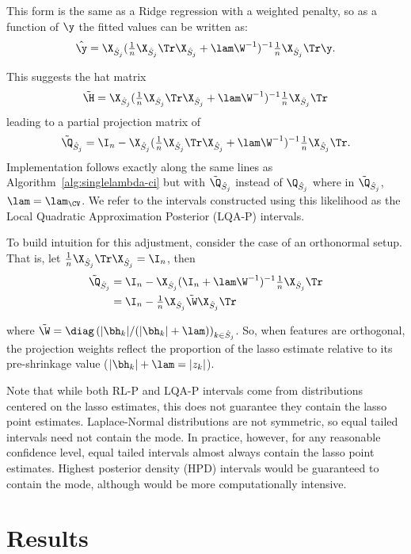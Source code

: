 \noindent This form is the same as a Ridge regression with a weighted penalty, so as a function of $\y$ the fitted values can be written as:
$$
\hat{\y} = \X_{\hat{S}_j}(\tfrac{1}{n}\X_{\hat{S}_j} \Tr\X_{\hat{S}_j} + \lam\W^{-1})^{-1}\tfrac{1}{n}\X_{\hat{S}_j} \Tr \y.
$$

\noindent This suggests the hat matrix 
$$\tilde{\H} = \X_{\hat{S}_j}(\tfrac{1}{n}\X_{\hat{S}_j} \Tr\X_{\hat{S}_j} + \lam\W^{-1})^{-1}\tfrac{1}{n}\X_{\hat{S}_j} \Tr$$
leading to a partial projection matrix of 
$$\tilde{\Q}_{\hat{S}_j} = \I_n - \X_{\hat{S}_j}(\tfrac{1}{n}\X_{\hat{S}_j} \Tr\X_{\hat{S}_j} + \lam\W^{-1})^{-1}\tfrac{1}{n}\X_{\hat{S}_j} \Tr.$$ 
Implementation follows exactly along the same lines as Algorithm~\ref{alg:singlelambda-ci} but with $\tilde{\Q}_{\hat{S}_j}$ instead of $\Q_{\hat{S}_j}$ where in $\tilde{\Q}_{\hat{S}_j}$, $\lam = \lam_{\CV}$. We refer to the intervals constructed using this likelihood as the Local Quadratic Approximation Posterior (LQA-P) intervals.

To build intuition for this adjustment, consider the case of an orthonormal setup. That is, let $\frac{1}{n}\X_{\hat{S}_j} \Tr\X_{\hat{S}_j} = \I_n$, then
$$
\begin{aligned}
\tilde{\Q}_{\hat{S}_j} &= \I_n - \X_{\hat{S}_j}(\I_n + \lam\W^{-1})^{-1}\tfrac{1}{n}\X_{\hat{S}_j} \Tr\\
&= \I_n - \tfrac{1}{n}\X_{\hat{S}_j}\tilde{\W}\X_{\hat{S}_j} \Tr \\
\end{aligned}
$$

\noindent where $\tilde{\W} = \diag\left(|\bh_k| / (|\bh_k| + \lam)\right)_{k \in \hat{S}_j}$. So, when features are orthogonal, the projection weights reflect the proportion of the lasso estimate relative to its pre-shrinkage value ($|\bh_k| + \lam = |z_k|$).

Note that while both RL-P and LQA-P intervals come from distributions centered on the lasso estimates, this does not guarantee they contain the lasso point estimates. Laplace-Normal distributions are not symmetric, so equal tailed intervals need not contain the mode. In practice, however, for any reasonable confidence level, equal tailed intervals almost always contain the lasso point estimates. Highest posterior density (HPD) intervals would be guaranteed to contain the mode, although would be more computationally intensive.

\section{Results}
\label{sec:results}

